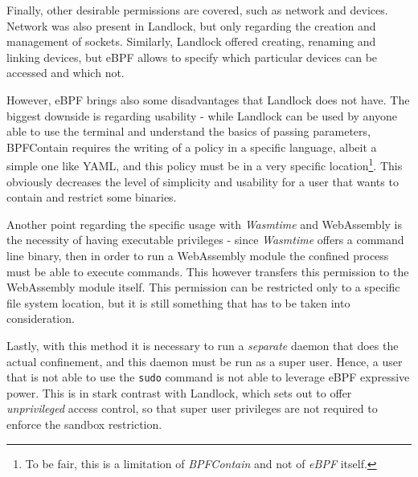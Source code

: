 Finally, other desirable permissions are covered, such as network and devices. Network was also present
in Landlock, but only regarding the creation and management of sockets. Similarly, Landlock offered
creating, renaming and linking devices, but eBPF allows to specify which particular devices can be accessed
and which not.

However, eBPF brings also some disadvantages that Landlock does not have.
The biggest downside is regarding usability - while Landlock can be used by anyone able to use
the terminal and understand the basics of passing parameters, BPFContain requires the writing
of a policy in a specific language, albeit a simple one like YAML, and this policy must be in a very
specific location\footnote{To be fair, this is a limitation of \textit{BPFContain} and not of \textit{eBPF} itself.}.
This obviously decreases the level of simplicity and usability for a user that wants to contain and restrict
some binaries.

Another point regarding the specific usage with \textit{Wasmtime} and WebAssembly is the necessity of
having executable privileges - since \textit{Wasmtime} offers a command line binary, then in order to run
a WebAssembly module the confined process must be able to execute commands. This however transfers this
permission to the WebAssembly module itself. This permission can be restricted only to a specific file system
location, but it is still something that has to be taken into consideration.

Lastly, with this method it is necessary to run a \textit{separate} daemon that does the actual
confinement, and this daemon must be run as a super user.
Hence, a user that is not able to use the \texttt{sudo} command is not able to leverage eBPF
expressive power.
This is in stark contrast with Landlock, which sets out to offer \textit{unprivileged} access control,
so that super user privileges are not required to enforce the sandbox restriction.